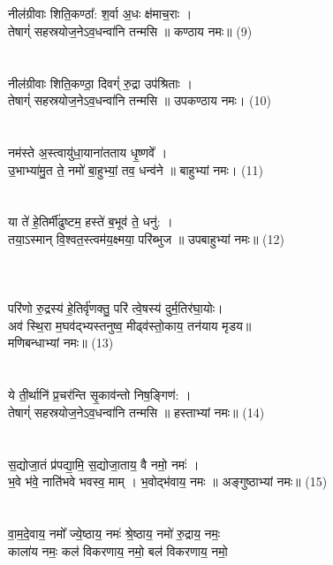 {\small{}}\\
\\
नील॑ग्रीवाः शिति॒कण्ठा᳚: श॒र्वा अ॒धः क्ष॑माच॒राः ।\\
तेषाग्ं॑ सहस्रयोज॒नेऽव॒धन्वा॑नि तन्मसि ॥ कण्ठाय नमः॥ (9)\\
{\small{}}\\
\\
नील॑ग्रीवाः शिति॒कण्ठा॒ दिवग्ं॑ रु॒द्रा उप॑श्रिताः ।\\
तेषाग्ं॑ सहस्रयोज॒नेऽव॒धन्वा॑नि तन्मसि ॥ उपकण्ठाय नमः। (10)\\
{\small{}}\\
\\
नम॑स्ते अ॒स्त्वायु॑धा॒याना॑तताय धृ॒ष्णवे᳚ ।\\
उ॒भाभ्या॑मु॒त ते॒ नमो॑ बा॒हुभ्यां॒ तव॒ धन्व॑ने ॥ बाहुभ्यां नमः। (11)\\
{\small{}}\\
\\
या ते॑ हे॒तिर्मी॑ढुष्टम॒ हस्ते॑ ब॒भूव॑ ते॒ धनु॑: ।\\
तया॒ऽस्मान् वि॒श्वत॒स्त्वम॑य॒क्ष्मया॒ परि॑ब्भुज ॥ उपबाहुभ्यां नमः॥ (12)\\
{\small{}}\\
\\
{\small{}}\\
परि॑णो रु॒द्रस्य॑ हे॒तिर्वृ॑णक्तु॒ परि॑ त्वे॒षस्य॑ दुर्म॒तिर॑घा॒योः।\\
अव॑ स्थि॒रा म॒घव॑द्भ्यस्तनुष्व॒ मीढ्व॑स्तो॒काय॒ तन॑याय मृडय॥\\
मणिबन्धाभ्यां नमः॥ (13)\\
{\small{}}\\
\\
ये ती॒र्थानि॑ प्र॒चर॑न्ति सृ॒काव॑न्तो निष॒ङ्गिण॑: ।\\
तेषाग्ं॑ सहस्रयोज॒नेऽव॒धन्वा॑नि तन्मसि ॥ हस्ताभ्यां नमः॥ (14)\\
{\small{}}\\
\\
स॒द्योजा॒तं प्र॑पद्या॒मि॒ स॒द्योजा॒ताय॒ वै नमो॒ नमः॑ ।\\
भ॒वे भ॑वे॒ नाति॑भवे भवस्व॒ माम् । भ॒वोद्भ॑वाय॒ नमः ॥ अङ्गुष्ठाभ्यां नमः॥ (15)\\
{\small{}}\\
\\
वा॒म॒दे॒वाय॒ नमो᳚ ज्ये॒ष्ठाय॒ नमः॑ श्रे॒ष्ठाय॒ नमो॑ रु॒द्राय॒ नमः॒ \\
काला॑य नमः॒ कल॑ विकरणाय॒ नमो॒ बल॑ विकरणाय॒ नमो॒\\
